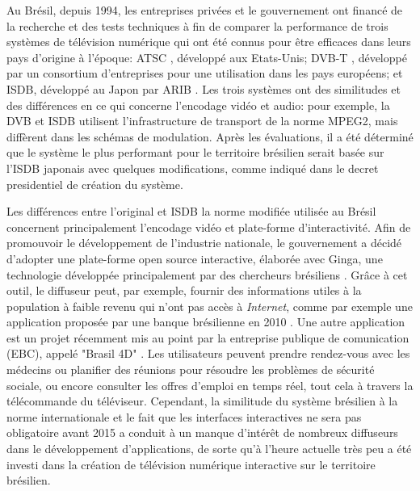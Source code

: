 \documentclass[12pt,a4paper]{article}
\begin{document}
Au Brésil, depuis 1994, les entreprises privées et le gouvernement ont financé de la recherche et des tests techniques à fin de comparer la performance de trois systèmes de télévision numérique qui ont été connus pour être efficaces dans leurs pays d'origine à l'époque: ATSC \cite{ATSC}, développé aux Etats-Unis; DVB-T \cite{DVB}, développé par un consortium d'entreprises pour une utilisation dans les pays européens; et ISDB, développé au Japon par ARIB \cite{ARIB}. Les trois systèmes ont des similitudes et des différences en ce qui concerne l'encodage vidéo et audio: pour exemple, la DVB et ISDB utilisent l'infrastructure de transport de la norme MPEG2, mais diffèrent dans les schémas de modulation. Après les évaluations, il a été déterminé que le système le plus performant pour le territoire brésilien serait basée sur l'ISDB japonais avec quelques modifications, comme indiqué dans le decret presidentiel de création du système\cite{decreto8061}.

Les différences entre l'original et ISDB la norme modifiée utilisée au Brésil concernent principalement l'encodage vidéo et plate-forme d'interactivité. Afin de promouvoir le développement de l'industrie nationale, le gouvernement a décidé d'adopter une plate-forme open source interactive, élaborée avec Ginga, une technologie développée principalement par des chercheurs brésiliens \cite{PUCRJ}. Grâce à cet outil, le diffuseur peut, par exemple, fournir des informations utiles à la population à faible revenu qui n'ont pas accès à \textit{Internet}, comme par exemple une application proposée par une banque brésilienne en 2010 \cite{caixa}. Une autre application est un projet récemment mis au point par la entreprise publique de comunication (EBC), appelé "Brasil 4D" \cite{consultas}. Les utilisateurs peuvent prendre rendez-vous avec les médecins ou planifier des réunions pour résoudre les problèmes de sécurité sociale, ou encore consulter les offres d'emploi en temps réel, tout cela à travers la télécommande du téléviseur. Cependant, la similitude du système brésilien à la norme internationale et le fait que les interfaces interactives ne sera pas obligatoire avant 2015 a conduit à un manque d'intérêt de nombreux diffuseurs dans le développement d'applications, de sorte qu'à l'heure actuelle très peu a été investi dans la création de télévision numérique interactive sur le territoire brésilien.
\end{document}
